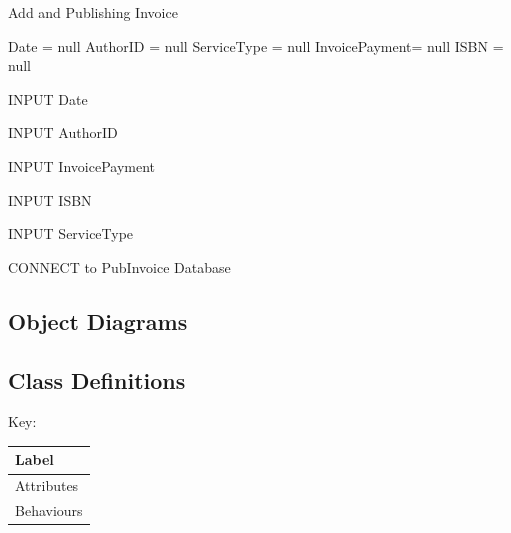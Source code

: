 \begin{algorithm}[H]
    \caption{Add and Publishing Invoice}
\begin{algorithmic}[1]



Date = null
AuthorID = null
ServiceType = null
InvoicePayment= null
ISBN = null


    INPUT Date

\EndWhile


    INPUT AuthorID

\EndWhile


    INPUT InvoicePayment

\EndWhile


    INPUT ISBN

\EndWhile


    INPUT ServiceType

\EndWhile

    
    CONNECT to PubInvoice Database
    
\EndIf

\EndFunction
\end{algorithmic}
\end{algorithm}



\subsection{Object Diagrams}

%

\subsection{Class Definitions}

Key:

\begin{tabular}{|p{2.5cm}|}
    \hline
    \textbf{Label}  \\ \hline
    Attributes \\ \hline
    Behaviours  \\ \hline
    \hline
\end{tabular}

